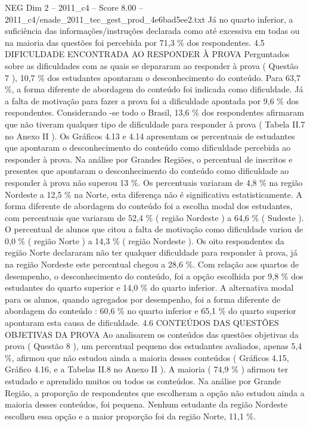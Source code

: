 \begin{textsample}{NEG Dim 2 – 2011\_c4 – Score 8.00 – 2011\_c4/enade\_2011\_tec\_gest\_prod\_4e6bad5ee2.txt}
Já no quarto inferior, a suficiência das informações/instruções declarada como até excessiva em todas ou na maioria das questões foi percebida por 71,3 \% dos respondentes. 4.5 DIFICULDADE ENCONTRADA AO RESPONDER À PROVA Perguntados sobre as dificuldades com as quais se depararam ao responder à prova ( Questão 7 ), 10,7 \% dos estudantes apontaram o desconhecimento do conteúdo.
Para 63,7 \%, a forma diferente de abordagem do conteúdo foi indicada como dificuldade.
Já a falta de motivação para fazer a prova foi a dificuldade apontada por 9,6 \% dos respondentes.
Considerando -se todo o Brasil, 13,6 \% dos respondentes afirmaram que não tiveram qualquer tipo de dificuldade para responder à prova ( Tabela II.7 no Anexo II ).
Os Gráficos 4.13 e 4.14 apresentam os percentuais de estudantes que apontaram o desconhecimento do conteúdo como dificuldade percebida ao responder à prova.
Na análise por Grandes Regiões, o percentual de inscritos e presentes que apontaram o desconhecimento do conteúdo como dificuldade ao responder à prova não superou 13 \%.
Os percentuais variaram de 4,8 \% na região Nordeste a 12,5 \% na Norte, esta diferença não é significativa estatisticamente.
A forma diferente de abordagem do conteúdo foi a escolha modal dos estudantes, com percentuais que variaram de 52,4 \% ( região Nordeste ) a 64,6 \% ( Sudeste ).
O percentual de alunos que citou a falta de motivação como dificuldade variou de 0,0 \% ( região Norte ) a 14,3 \% ( região Nordeste ).
Os oito respondentes da região Norte declararam não ter qualquer dificuldade para responder à prova, já na região Nordeste este percentual chegou a 28,6 \%.
Com relação aos quartos de desempenho, o desconhecimento do conteúdo, foi a opção escolhida por 9,8 \% dos estudantes do quarto superior e 14,0 \% do quarto inferior.
A alternativa modal para os alunos, quando agregados por desempenho, foi a forma diferente de abordagem do conteúdo : 60,6 \% no quarto inferior e 65,1 \% do quarto superior apontaram esta causa de dificuldade. 4.6 CONTEÚDOS DAS QUESTÕES OBJETIVAS DA PROVA Ao analisarem os conteúdos das questões objetivas da prova ( Questão 8 ), um percentual pequeno dos estudantes avaliados, apenas 5,4 \%, afirmou que não estudou ainda a maioria desses conteúdos ( Gráficos 4.15, Gráfico 4.16, e a Tabelas II.8 no Anexo II ).
A maioria ( 74,9 \% ) afirmou ter estudado e aprendido muitos ou todos os conteúdos.
Na análise por Grande Região, a proporção de respondentes que escolheram a opção não estudou ainda a maioria desses conteúdos, foi pequena.
Nenhum estudante da região Nordeste escolheu essa opção e a maior proporção foi da região Norte, 11,1 \%.

\end{textsample}
